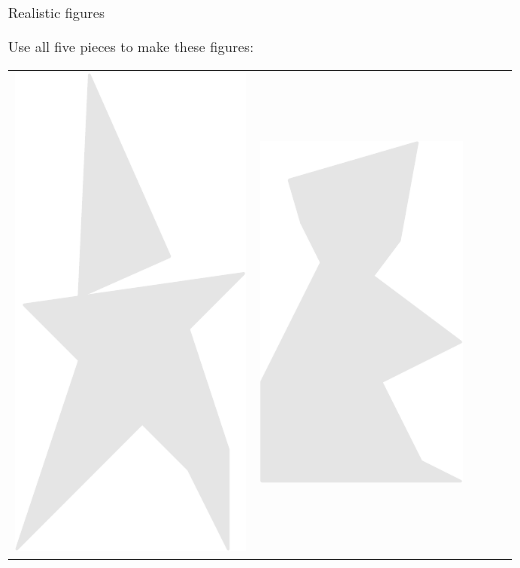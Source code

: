 \documentclass[14pt]{beamer}
\begin{document}
    \begin{frame}{Realistic figures}
        \vspace{-1em}
        \begin{center}
            \quad Use all five pieces to make these figures:

            \vspace{-0.8em}

            {\footnotesize
            \begin{tabular}{ccccc}
                \includegraphics[scale=0.20]{figures/figure026aa.pdf} &
                \includegraphics[scale=0.20]{figures/figure026bf.pdf}  &

\end{tabular}}
\end{center}
\end{frame}
\end{document}
